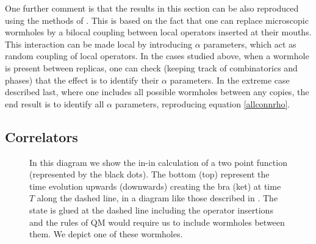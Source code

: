 \documentclass[11pt]{article}
\numberwithin{equation}{section}
\begin{document}
One further comment is that the results in this section can be also reproduced using the methods of \cite{Klebanov:1988eh}. This is based on the fact that one can replace microscopic wormholes by a bilocal coupling between local operators inserted at their mouths. This interaction can be made local by introducing $\alpha$ parameters, which act as random coupling of local operators. In the cases studied above, when a wormhole is present between replicas, one can check (keeping track of combinatorics and phases) that the effect is to identify their $\alpha$ parameters. In the extreme case described last, where one includes all possible wormholes between any copies, the end result is to identify all $\alpha$ parameters, reproducing equation \eqref{allconnrho}.

\subsection{Correlators} 

\begin{figure}[t!]
\begin{center}
 \caption{\label{fig:whcorr} In this diagram we show the in-in calculation of a two point function (represented by the black dots). The bottom (top) represent the time evolution upwards (downwards) creating the bra (ket) at time $T$ along the dashed line, in a diagram like those described in \cite{GiSl3}. The state is glued at the dashed line including the operator insertions and the rules of QM would require us to include wormholes between them. We depict one of these wormholes.}
\end{center}
\end{figure}
\end{document}
